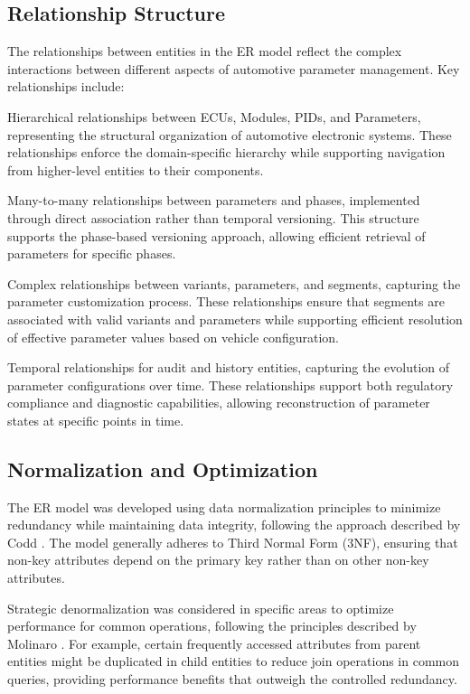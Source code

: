\subsection{Relationship Structure}
\label{subsec:relationship-structure}

The relationships between entities in the ER model reflect the complex interactions between different aspects of automotive parameter management. Key relationships include:

Hierarchical relationships between \acp{ECU}, Modules, PIDs, and Parameters, representing the structural organization of automotive electronic systems. These relationships enforce the domain-specific hierarchy while supporting navigation from higher-level entities to their components.

Many-to-many relationships between parameters and phases, implemented through direct association rather than temporal versioning. This structure supports the phase-based versioning approach, allowing efficient retrieval of parameters for specific phases.

Complex relationships between variants, parameters, and segments, capturing the parameter customization process. These relationships ensure that segments are associated with valid variants and parameters while supporting efficient resolution of effective parameter values based on vehicle configuration.

Temporal relationships for audit and history entities, capturing the evolution of parameter configurations over time. These relationships support both regulatory compliance and diagnostic capabilities, allowing reconstruction of parameter states at specific points in time.

\subsection{Normalization and Optimization}
\label{subsec:normalization-optimization}

The ER model was developed using data normalization principles to minimize redundancy while maintaining data integrity, following the approach described by Codd \cite{codd1970relational}. The model generally adheres to Third Normal Form (3NF), ensuring that non-key attributes depend on the primary key rather than on other non-key attributes.

Strategic denormalization was considered in specific areas to optimize performance for common operations, following the principles described by Molinaro \cite{molinaro2005sql}. For example, certain frequently accessed attributes from parent entities might be duplicated in child entities to reduce join operations in common queries, providing performance benefits that outweigh the controlled redundancy.

